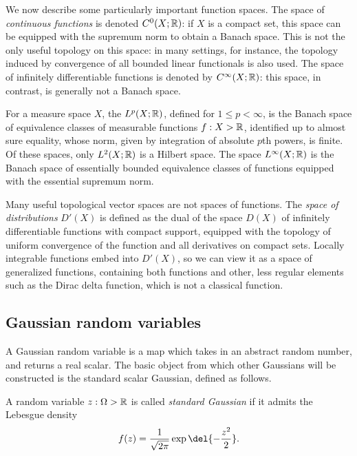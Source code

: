 \documentclass[11pt]{book}
\begin{document}
We now describe some particularly important function spaces.
The space of \emph{continuous functions} is denoted $C^0(X;\mathbb{R})$: if $X$ is a compact set, this space can be equipped with the supremum norm to obtain a Banach space.
This is not the only useful topology on this space: in many settings, for instance, the topology induced by convergence of all bounded linear functionals is also used.
The space of infinitely differentiable functions is denoted by $C^\infty(X;\mathbb{R})$: this space, in contrast, is generally not a Banach space.

For a measure space $X$, the  $L^p(X;\mathbb{R})$, defined for $1 \leq p < \infty$, is the Banach space of equivalence classes of measurable functions $f : X \-> \mathbb{R}$, identified up to almost sure equality, whose norm, given by integration of absolute $p$th powers, is finite.
Of these spaces, only $L^2(X;\mathbb{R})$ is a Hilbert space.
The space $L^\infty(X;\mathbb{R})$ is the Banach space of essentially bounded equivalence classes of functions equipped with the essential supremum norm.

Many useful topological vector spaces are not spaces of functions.
The \emph{space of distributions} $D'(X)$ is defined as the dual of the space $D(X)$ of infinitely differentiable functions with compact support, equipped with the topology of uniform convergence of the function and all derivatives on compact sets.
Locally integrable functions embed into $D'(X)$, so we can view it as a space of generalized functions, containing both functions and other, less regular elements such as the Dirac delta function, which is not a classical function.


\subsection{Gaussian random variables}

A Gaussian random variable is a map which takes in an abstract random number, and returns a real scalar.
The basic object from which other Gaussians will be constructed is the standard scalar Gaussian, defined as follows.

\begin{definition}
A random variable $z : \Omega\->\mathbb{R}$ is called \emph{standard Gaussian} if it admits the Lebesgue density
\[
f(z) = \frac{1}{\sqrt{2\pi}} \exp\del{-\frac{z^2}{2}}
.
\]
\end{definition}
\end{document}
